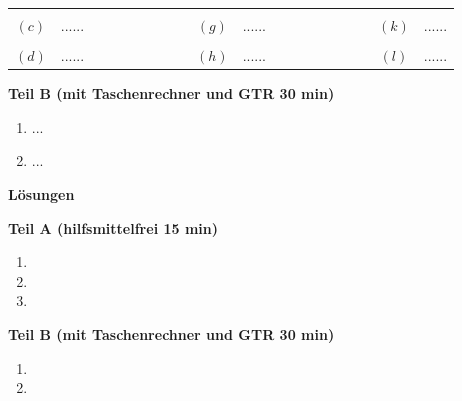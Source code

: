 \documentclass[12pt, a4paper]{report} %
\begin{document}
\begin{enumerate}
\begin{center}
\begin{tabular}{c l c c l c c l}
				& & & & & & &\\
				$(c)$ & ...... & $\qquad \qquad \qquad$ & $(g)$ & ...... & $\qquad \qquad \qquad$ & $(k)$ & ......\\
				& & & & & & &\\
				$(d)$ & ...... & $\qquad \qquad \qquad$ & $(h)$ & ...... & $\qquad \qquad \qquad$ & $(l)$ & ......\\
			\end{tabular}\end{center}
	\end{enumerate}
	
	\newpage %
	
	\noindent
	\textbf{Teil B (mit Taschenrechner und GTR 30 min)}
	\begin{enumerate}
		\item ... 
		\item ...
	\end{enumerate}
	
	\newpage

	\begin{center}\textbf{\large{Lösungen}}\end{center}
	\bigskip
	\textbf{Teil A (hilfsmittelfrei 15 min)}
	\begin{enumerate}
		\item 
		\item
		\item
	\end{enumerate}
	\bigskip
	\textbf{Teil B (mit Taschenrechner und GTR 30 min)}
	\begin{enumerate}
		\item
		\item 
	\end{enumerate}
\end{document}
